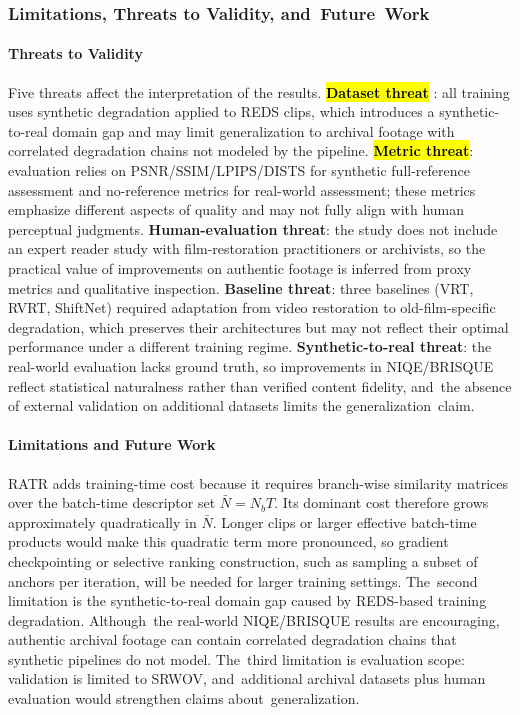 \documentclass[symmetry,article,accept,pdftex,moreauthors]{Definitions/mdpi}
\begin{document}
\subsubsection{Limitations, Threats to Validity, and~Future~Work}
\label{subsec:limitations}

\paragraph{Threats to Validity}
Five threats affect the interpretation of the results. \textbf{\hl{Dataset threat}%
}: all training uses synthetic degradation applied to REDS clips, which introduces a synthetic-to-real domain gap and may limit generalization to archival footage with correlated degradation chains not modeled by the pipeline. \textbf{\hl{Metric threat}}: evaluation relies on PSNR/SSIM/LPIPS/DISTS for synthetic full-reference assessment and no-reference metrics for real-world assessment; these metrics emphasize different aspects of quality and may not fully align with human perceptual judgments. \textbf{Human-evaluation threat}: the study does not include an expert reader study with film-restoration practitioners or archivists, so the practical value of \mbox{improvements} on authentic footage is inferred from proxy metrics and qualitative inspection. \textbf{Baseline threat}: three baselines (VRT, RVRT, ShiftNet) required adaptation from video restoration to old-film-specific degradation, which preserves their architectures but may not reflect their optimal performance under a different training regime. \textbf{Synthetic-to-real threat}: the real-world evaluation lacks ground truth, so improvements in NIQE/BRISQUE reflect statistical naturalness rather than verified content fidelity, and~the absence of external validation on additional datasets limits the generalization~claim.

\paragraph{Limitations and Future Work}
RATR adds training-time cost because it requires branch-wise similarity matrices over the batch-time descriptor set $\bar{N}=N_bT$. Its dominant cost therefore grows approximately quadratically in $\bar{N}$. Longer clips or larger effective batch-time products would make this quadratic term more pronounced, so gradient checkpointing or selective ranking construction, such as sampling a subset of anchors per iteration, will be needed for larger training settings. The~second limitation is the synthetic-to-real domain gap caused by REDS-based training degradation. Although~the real-world NIQE/BRISQUE results are encouraging, authentic archival footage can contain correlated degradation chains that synthetic pipelines do not model. The~third limitation is evaluation scope: validation is limited to SRWOV, and~additional archival datasets plus human evaluation would strengthen claims about~generalization.
\end{document}
